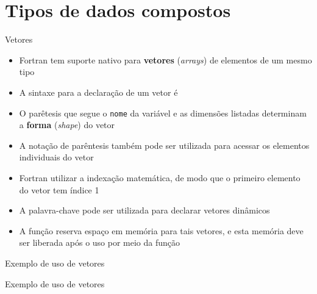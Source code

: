 \section{Tipos de dados compostos}

\begin{frame}[fragile]{Vetores}

    \begin{itemize}
        \item Fortran tem suporte nativo para \textbf{vetores} (\textit{arrays}) de elementos de 
            um mesmo tipo

        \item A sintaxe para a declaração de um vetor é 


        \item O parêtesis que segue o \texttt{nome} da variável e as dimensões listadas
            determinam a \textbf{forma} (\textit{shape}) do vetor

        \item A notação de parêntesis também pode ser utilizada para acessar os elementos
            individuais do vetor

        \item Fortran utilizar a indexação matemática, de modo que o primeiro elemento do vetor
            tem índice 1

        \item A palavra-chave  pode ser utilizada para declarar
            vetores dinâmicos

        \item A função  reserva espaço em memória para tais vetores, e
            esta memória deve ser liberada após o uso por meio da função 

    \end{itemize}

\end{frame}

\begin{frame}[fragile]{Exemplo de uso de vetores}
\end{frame}

\begin{frame}[fragile]{Exemplo de uso de vetores}
\end{frame}

